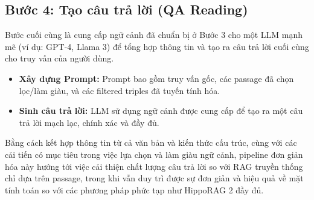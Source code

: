 \documentclass[../main.tex]{subfiles}
\begin{document}
\subsection{Bước 4: Tạo câu trả lời (QA Reading)}
Bước cuối cùng là cung cấp ngữ cảnh đã chuẩn bị ở Bước 3 cho một LLM mạnh mẽ (ví dụ: GPT-4, Llama 3) để tổng hợp thông tin và tạo ra câu trả lời cuối cùng cho truy vấn của người dùng.
\begin{itemize}
    \item \textbf{Xây dựng Prompt:} Prompt bao gồm truy vấn gốc, các passage đã chọn lọc/làm giàu, và các filtered triples đã tuyến tính hóa.
    \item \textbf{Sinh câu trả lời:} LLM sử dụng ngữ cảnh được cung cấp để tạo ra một câu trả lời mạch lạc, chính xác và đầy đủ.
\end{itemize}
Bằng cách kết hợp thông tin từ cả văn bản và kiến thức cấu trúc, cùng với các cải tiến có mục tiêu trong việc lựa chọn và làm giàu ngữ cảnh, pipeline đơn giản hóa này hướng tới việc cải thiện chất lượng câu trả lời so với RAG truyền thống chỉ dựa trên passage, trong khi vẫn duy trì được sự đơn giản và hiệu quả về mặt tính toán so với các phương pháp phức tạp như HippoRAG 2 đầy đủ.
\end{document}
